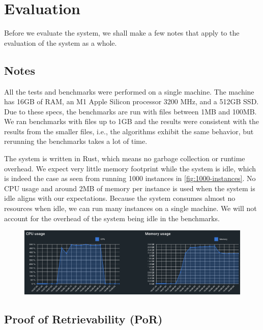 \chapter{Evaluation}
\label{chapter:evaluation}

Before we evaluate the system, we shall make a few notes that apply to the evaluation of the system as a whole.

\section{Notes}
\label{section:notes}

All the tests and benchmarks were performed on a single machine.
The machine has 16GB of RAM, an M1 Apple Silicon processor 3200 MHz, and a 512GB SSD.
Due to these specs, the benchmarks are run with files between 1MB and 100MB.
We ran benchmarks with files up to 1GB and the results were consistent with the results from the smaller files,
i.e., the algorithms exhibit the same behavior, but rerunning the benchmarks takes a lot of time.

The system is written in Rust, which means no garbage collection or runtime overhead.
We expect very little memory footprint while the system is idle,
which is indeed the case as seen from running 1000 instances in \autoref{fig:1000-instances}.
No CPU usage and around 2MB of memory per instance is used when the system is idle
aligns with our expectations.
Because the system consumes almost no resources when idle,
we can run many instances on a single machine.
We will not account for the overhead of the system being idle in the benchmarks.

\begin{figure}
    \centering
    \includegraphics[width=350pt]{gfx/1000-instances.png}
    \label{fig:1000-instances}
\end{figure}

\section{Proof of Retrievability (PoR)}
\label{section:por-evaluation}

